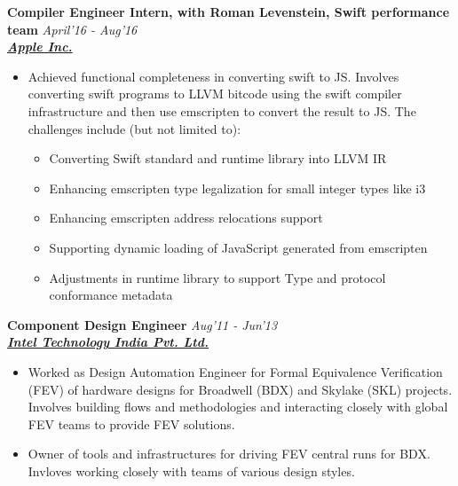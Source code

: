 \documentclass[9pt]{article}
\newenvironment{changemargin}[2]{%
  \begin{list}{}{%
    \setlength{\topsep}{0pt}%
    \setlength{\leftmargin}{#1}%
    \setlength{\rightmargin}{#2}%
    \setlength{\listparindent}{\parindent}%
    \setlength{\itemindent}{\parindent}%
    \setlength{\parsep}{\parskip}%
  }%
  \item[]}{\end{list}
}
\newenvironment{body} {
	\vspace*{-16pt}
	\begin{changemargin}{-0.25in}{-0.5in}
  }	
	{\end{changemargin}
}
\begin{document}
\begin{body}
 \medskip
        \textbf{Compiler Engineer Intern, with Roman Levenstein, Swift performance team} \hfill \emph{April'16 - Aug'16}\\
	\textbf{\emph{\href{http://www.apple.com}{Apple Inc.}}}
	\begin{itemize} \itemsep -0pt

                \item  Achieved functional completeness in converting swift to JS. Involves 
                 converting swift programs to LLVM bitcode using the
                swift compiler infrastructure and then use emscripten to convert the result to
                JS. The challenges include (but not limited to):
                  \begin{itemize}
                    \item Converting Swift standard and runtime library into LLVM IR
                    \item Enhancing emscripten type legalization for small integer types like i3
                    \item Enhancing emscripten address relocations support
                    \item Supporting dynamic loading of JavaScript generated from emscripten
                    \item Adjustments in runtime library  to support Type and protocol conformance metadata
                  \end{itemize}

	\end{itemize}

 \medskip
        \textbf{Component Design Engineer} \hfill \emph{Aug'11 - Jun'13}\\
	\textbf{\emph{\href{http://www.intel.in/content/www/in/en/homepage.html}{Intel Technology India Pvt. Ltd.}}}
	\begin{itemize} \itemsep -0pt
                \item Worked as Design Automation Engineer for Formal Equivalence Verification (FEV) of hardware designs for Broadwell (BDX) and Skylake (SKL) projects. Involves
                building flows and methodologies and interacting closely with
                global FEV teams to provide FEV solutions.
                \item Owner of tools and infrastructures for driving
                FEV central runs for  BDX. Invloves working closely with teams of various
                design styles.
	\end{itemize} 


\end{body}
\end{document}
